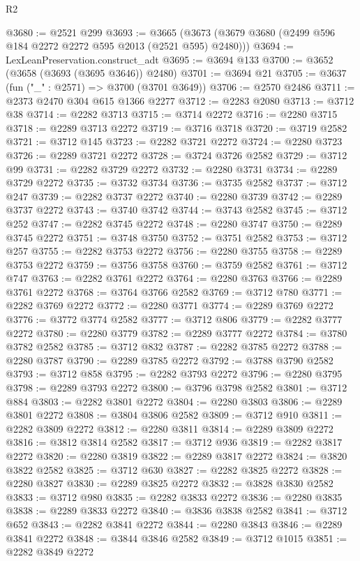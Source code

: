 \begin{lexlean}{R2}
\begin{coremodule}
@3680 := @2521 @299
@3693 := @3665 (@3673 (@3679 @3680 (@2499 @596 @184 @2272 @2272 @595 @2013 (@2521 @595) @2480)))
@3694 := LexLeanPreservation.construct_adt
@3695 := @3694 @133
@3700 := @3652 (@3658 (@3693 (@3695 @3646)) @2480)
@3701 := @3694 @21
@3705 := @3637 (fun ("_" : @2571) => @3700 (@3701 @3649))
@3706 := @2570 @2486
@3711 := @2373 @2470 @304 @615 @1366 @2277
@3712 := @2283 @2080
@3713 := @3712 @38
@3714 := @2282 @3713
@3715 := @3714 @2272
@3716 := @2280 @3715
@3718 := @2289 @3713 @2272
@3719 := @3716 @3718
@3720 := @3719 @2582
@3721 := @3712 @145
@3723 := @2282 @3721 @2272
@3724 := @2280 @3723
@3726 := @2289 @3721 @2272
@3728 := @3724 @3726 @2582
@3729 := @3712 @99
@3731 := @2282 @3729 @2272
@3732 := @2280 @3731
@3734 := @2289 @3729 @2272
@3735 := @3732 @3734
@3736 := @3735 @2582
@3737 := @3712 @247
@3739 := @2282 @3737 @2272
@3740 := @2280 @3739
@3742 := @2289 @3737 @2272
@3743 := @3740 @3742
@3744 := @3743 @2582
@3745 := @3712 @252
@3747 := @2282 @3745 @2272
@3748 := @2280 @3747
@3750 := @2289 @3745 @2272
@3751 := @3748 @3750
@3752 := @3751 @2582
@3753 := @3712 @257
@3755 := @2282 @3753 @2272
@3756 := @2280 @3755
@3758 := @2289 @3753 @2272
@3759 := @3756 @3758
@3760 := @3759 @2582
@3761 := @3712 @747
@3763 := @2282 @3761 @2272
@3764 := @2280 @3763
@3766 := @2289 @3761 @2272
@3768 := @3764 @3766 @2582
@3769 := @3712 @780
@3771 := @2282 @3769 @2272
@3772 := @2280 @3771
@3774 := @2289 @3769 @2272
@3776 := @3772 @3774 @2582
@3777 := @3712 @806
@3779 := @2282 @3777 @2272
@3780 := @2280 @3779
@3782 := @2289 @3777 @2272
@3784 := @3780 @3782 @2582
@3785 := @3712 @832
@3787 := @2282 @3785 @2272
@3788 := @2280 @3787
@3790 := @2289 @3785 @2272
@3792 := @3788 @3790 @2582
@3793 := @3712 @858
@3795 := @2282 @3793 @2272
@3796 := @2280 @3795
@3798 := @2289 @3793 @2272
@3800 := @3796 @3798 @2582
@3801 := @3712 @884
@3803 := @2282 @3801 @2272
@3804 := @2280 @3803
@3806 := @2289 @3801 @2272
@3808 := @3804 @3806 @2582
@3809 := @3712 @910
@3811 := @2282 @3809 @2272
@3812 := @2280 @3811
@3814 := @2289 @3809 @2272
@3816 := @3812 @3814 @2582
@3817 := @3712 @936
@3819 := @2282 @3817 @2272
@3820 := @2280 @3819
@3822 := @2289 @3817 @2272
@3824 := @3820 @3822 @2582
@3825 := @3712 @630
@3827 := @2282 @3825 @2272
@3828 := @2280 @3827
@3830 := @2289 @3825 @2272
@3832 := @3828 @3830 @2582
@3833 := @3712 @980
@3835 := @2282 @3833 @2272
@3836 := @2280 @3835
@3838 := @2289 @3833 @2272
@3840 := @3836 @3838 @2582
@3841 := @3712 @652
@3843 := @2282 @3841 @2272
@3844 := @2280 @3843
@3846 := @2289 @3841 @2272
@3848 := @3844 @3846 @2582
@3849 := @3712 @1015
@3851 := @2282 @3849 @2272

\end{coremodule}
\end{lexlean}
